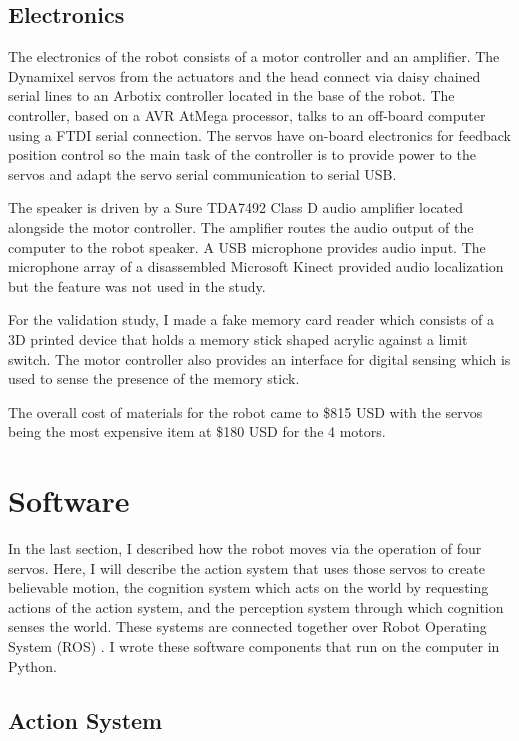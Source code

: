 \subsection{Electronics}

The electronics of the robot consists of a motor controller and an amplifier. The Dynamixel servos from the actuators and the head connect via daisy chained serial lines to an Arbotix controller located in the base of the robot. The controller, based on a AVR AtMega processor, talks to an off-board computer using a FTDI serial connection. The servos have on-board electronics for feedback position control so the main task of the controller is to provide power to the servos and adapt the servo serial communication to serial USB. 

The speaker is driven by a Sure TDA7492 Class D audio amplifier located alongside the motor controller. The amplifier routes the audio output of the computer to the robot speaker. A USB microphone provides audio input. The microphone array of a disassembled Microsoft Kinect provided audio localization but the feature was not used in the study. 

For the validation study, I made a fake memory card reader which consists of a 3D printed device that holds a memory stick shaped acrylic against a limit switch. The motor controller also provides an interface for digital sensing which is used to sense the presence of the memory stick.

The overall cost of materials for the robot came to \$815 USD with the servos being the most expensive item at \$180 USD for the 4 motors. 

\section{Software}

 In the last section, I described how the robot moves via the operation of four servos. Here, I will describe the action system that uses those servos to create believable motion, the cognition system which acts on the world by requesting actions of the action system, and the perception system through which cognition senses the world. These systems are connected together over Robot Operating System (ROS) \cite{ros}. I wrote these software components that run on the computer in Python. 


\subsection{Action System}


